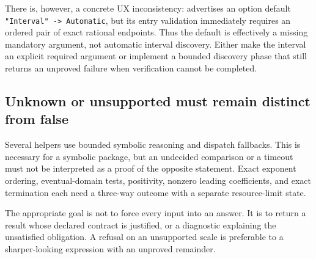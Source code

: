 There is, however, a concrete UX inconsistency:  advertises an option default \texttt{"Interval" -> Automatic}, but its entry validation immediately requires an ordered pair of exact rational endpoints. Thus the default is effectively a missing mandatory argument, not automatic interval discovery. Either make the interval an explicit required argument or implement a bounded discovery phase that still returns an unproved failure when verification cannot be completed.\cite{certificates}

\subsection{Unknown or unsupported must remain distinct from false}

Several helpers use bounded symbolic reasoning and dispatch fallbacks. This is necessary for a symbolic package, but an undecided comparison or a timeout must not be interpreted as a proof of the opposite statement. Exact exponent ordering, eventual-domain tests, positivity, nonzero leading coefficients, and exact termination each need a three-way outcome with a separate resource-limit state.\cite{core,inverseexpressions,parameterized}

The appropriate goal is not to force every input into an answer. It is to return a result whose declared contract is justified, or a diagnostic explaining the unsatisfied obligation. A refusal on an unsupported scale is preferable to a sharper-looking expression with an unproved remainder.
